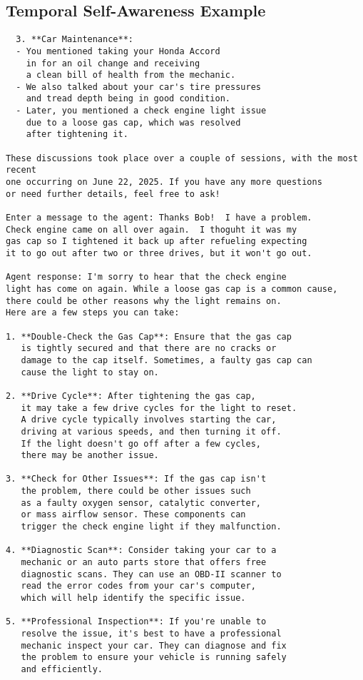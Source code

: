 \documentclass[11pt]{article}
\begin{document}
\subsection{Temporal Self-Awareness Example}
\begin{verbatim}
  3. **Car Maintenance**:
  - You mentioned taking your Honda Accord 
    in for an oil change and receiving
    a clean bill of health from the mechanic.
  - We also talked about your car's tire pressures 
    and tread depth being in good condition.
  - Later, you mentioned a check engine light issue 
    due to a loose gas cap, which was resolved 
    after tightening it.

These discussions took place over a couple of sessions, with the most recent 
one occurring on June 22, 2025. If you have any more questions 
or need further details, feel free to ask!

Enter a message to the agent: Thanks Bob!  I have a problem.  
Check engine came on all over again.  I thoguht it was my 
gas cap so I tightened it back up after refueling expecting 
it to go out after two or three drives, but it won't go out.

Agent response: I'm sorry to hear that the check engine 
light has come on again. While a loose gas cap is a common cause, 
there could be other reasons why the light remains on.
Here are a few steps you can take:

1. **Double-Check the Gas Cap**: Ensure that the gas cap 
   is tightly secured and that there are no cracks or 
   damage to the cap itself. Sometimes, a faulty gas cap can 
   cause the light to stay on.

2. **Drive Cycle**: After tightening the gas cap, 
   it may take a few drive cycles for the light to reset. 
   A drive cycle typically involves starting the car, 
   driving at various speeds, and then turning it off. 
   If the light doesn't go off after a few cycles, 
   there may be another issue.

3. **Check for Other Issues**: If the gas cap isn't 
   the problem, there could be other issues such 
   as a faulty oxygen sensor, catalytic converter, 
   or mass airflow sensor. These components can 
   trigger the check engine light if they malfunction.

4. **Diagnostic Scan**: Consider taking your car to a 
   mechanic or an auto parts store that offers free 
   diagnostic scans. They can use an OBD-II scanner to 
   read the error codes from your car's computer, 
   which will help identify the specific issue.

5. **Professional Inspection**: If you're unable to 
   resolve the issue, it's best to have a professional 
   mechanic inspect your car. They can diagnose and fix 
   the problem to ensure your vehicle is running safely 
   and efficiently.

\end{verbatim}
\end{document}
